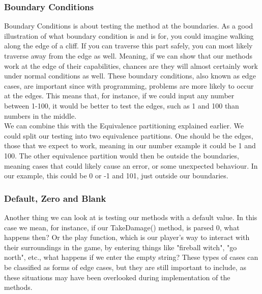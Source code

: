 \subsubsection{Boundary Conditions}
Boundary Conditions is about testing the method at the boundaries. As a good illustration of what boundary condition is and is for, you could imagine walking along the edge of a cliff. If you can traverse this part safely, you can most likely traverse away from the edge as well. Meaning, if we can show that our methods work at the edge of their capabilities, chances are they will almost certainly work under normal conditions as well. These boundary conditions, also known as edge cases, are important since with programming, problems are more likely to occur at the edges\cite{TestingBlackbox}. This means that, for instance, if we could input any number between 1-100, it would be better to test the edges, such as 1 and 100 than numbers in the middle. \\
We can combine this with the Equivalence partitioning explained earlier. We could split our testing into two equivalence partitions. One should be the edges, those that we expect to work, meaning in our number example it could be 1 and 100. The other equivalence partition would then be outside the boundaries, meaning cases that could likely cause an error, or some unexpected behaviour. In our example, this could be 0 or -1 and 101, just outside our boundaries. 
\subsubsection{Default, Zero and Blank}
Another thing we can look at is testing our methods with a default value. In this case we mean, for instance, if our TakeDamage() method, is parsed 0, what happens then? Or the play function, which is our player's way to interact with their surroundings in the game, by entering things like "fireball witch", "go north", etc., what happens if we enter the empty string? These types of cases can be classified as forms of edge cases, but they are still important to include, as these situations may have been overlooked during implementation of the methods\cite{TestingBlackbox}.
